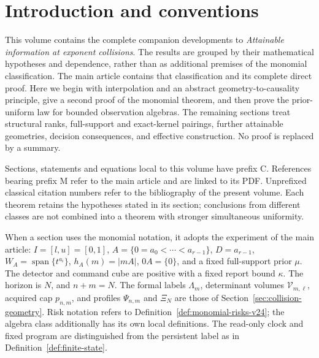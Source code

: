 \section*{Introduction and conventions}
This volume contains the complete companion developments to
\emph{Attainable information at exponent collisions}. The results are
grouped by their mathematical hypotheses and dependence, rather than
as additional premises of the monomial classification. The main article
contains that classification and its complete direct proof. Here we
begin with interpolation and an abstract geometry-to-causality
principle, give a second proof of the monomial theorem, and then prove
the prior-uniform law for bounded observation algebras. The remaining
sections treat structural ranks, full-support and exact-kernel
pairings, further attainable geometries, decision consequences, and
effective construction. No proof is replaced by a summary.

Sections, statements and equations local to this volume have prefix C.
References bearing prefix M refer to the main article and are linked
to its PDF. Unprefixed classical citation numbers refer to the
bibliography of the present volume. Each theorem retains the
hypotheses stated in its section; conclusions from different classes
are not combined into a theorem with stronger simultaneous uniformity.

When a section uses the monomial notation, it adopts the experiment
of the main article: $I=[l,u]=[0,1]$,
$A=\{0=a_0<\cdots<a_{r-1}\}$, $D=a_{r-1}$,
$W_A=\operatorname{span}\{t^{a_i}\}$, $h_A(m)=|mA|$,
$0A=\{0\}$, and a fixed full-support prior $\mu$.
The detector and command cube are positive with a fixed report bound
$\kappa$. The horizon is $N$, and $n+m=N$.
The formal labels $\Lambda_m$, determinant volumes
$\mathcal V_{m,\ell}$, acquired cap $p_{n,m}$, and profiles
$\Psi_{n,m}$ and $\Xi_N$ are those of
Section~\ref{sec:collision-geometry}. Risk notation refers to
Definition~\ref{def:monomial-risks-v24}; the algebra class additionally
has its own local definitions. The read-only clock and fixed program
are distinguished from the persistent label as in
Definition~\ref{def:finite-state}.

